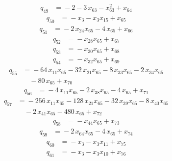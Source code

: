 \documentclass[11pt]{article}
\theoremstyle{remark}\newtheorem{remark}[theorem]{Remark}
\begin{document}
\begin{align*}
q_{49} &={}-2 -3\,x_{63} -x_{63}^{2} +x_{64}
\end{align*}
\begin{align*}
q_{50} &={}-x_{3} -x_{3}x_{15} +x_{65}
\end{align*}
\begin{align*}
q_{51} &={}-2\,x_{24}x_{65} -4\,x_{65} +x_{66}
\end{align*}
\begin{align*}
q_{52} &={}-x_{28}x_{65} +x_{67}
\end{align*}
\begin{align*}
q_{53} &={}-x_{30}x_{65} +x_{68}
\end{align*}
\begin{align*}
q_{54} &={}-x_{32}x_{65} +x_{69}
\end{align*}
\begin{align*}
q_{55} &={}-64\,x_{11}x_{65} -32\,x_{21}x_{65} -8\,x_{33}x_{65} -2\,x_{34}x_{65}\\
&\quad -80\,x_{65} +x_{70}
\end{align*}
\begin{align*}
q_{56} &={}-4\,x_{11}x_{65} -2\,x_{38}x_{65} -4\,x_{65} +x_{71}
\end{align*}
\begin{align*}
q_{57} &={}-256\,x_{11}x_{65} -128\,x_{21}x_{65} -32\,x_{39}x_{65} -8\,x_{40}x_{65}\\
&\quad -2\,x_{41}x_{65} -480\,x_{65} +x_{72}
\end{align*}
\begin{align*}
q_{58} &={}-x_{44}x_{65} +x_{73}
\end{align*}
\begin{align*}
q_{59} &={}-2\,x_{64}x_{65} -4\,x_{65} +x_{74}
\end{align*}
\begin{align*}
q_{60} &={}-x_{3} -x_{3}x_{11} +x_{75}
\end{align*}
\begin{align*}
q_{61} &={}-x_{3} -x_{3}x_{10} +x_{76}
\end{align*}
\end{document}
